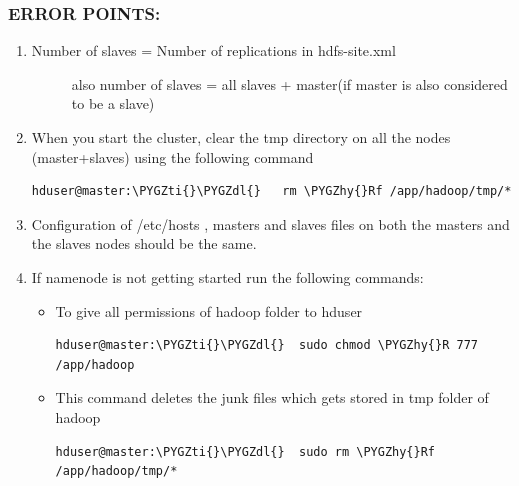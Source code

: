 \documentclass[a4paper,12pt,oneside]{sphinxmanual}
\def\PYGZdl{\char`\$}
\def\PYGZhy{\char`\-}
\def\PYGZti{\char`\~}
\begin{document}
\subsubsection{ERROR POINTS:}
\label{document:id11}\begin{enumerate}
\item {} \begin{description}
\item[{Number of slaves = Number of replications in hdfs-site.xml}] \leavevmode
also number of slaves = all slaves + master(if master is also considered to be a slave)

\end{description}

\item {} 
When you start the cluster, clear the tmp directory on all the nodes (master+slaves) using the following command

\begin{Verbatim}[commandchars=\\\{\}]
hduser@master:\PYGZti{}\PYGZdl{}   rm \PYGZhy{}Rf /app/hadoop/tmp/*
\end{Verbatim}

\item {} 
Configuration of /etc/hosts , masters  and slaves files on both the masters and the slaves nodes should be the same.

\item {} 
If namenode is not getting started run the following commands:
\begin{itemize}
\item {} 
To give all permissions  of hadoop folder to hduser

\begin{Verbatim}[commandchars=\\\{\}]
hduser@master:\PYGZti{}\PYGZdl{}  sudo chmod \PYGZhy{}R 777 /app/hadoop
\end{Verbatim}

\item {} 
This command deletes the junk files which gets stored in tmp folder of hadoop

\begin{Verbatim}[commandchars=\\\{\}]
hduser@master:\PYGZti{}\PYGZdl{}  sudo rm \PYGZhy{}Rf /app/hadoop/tmp/*
\end{Verbatim}

\end{itemize}

\end{enumerate}
\end{document}
